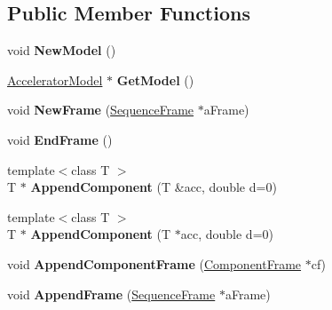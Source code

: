 \subsection*{Public Member Functions}
\begin{DoxyCompactItemize}
\item 
\mbox{\label{classAcceleratorModelConstructor_a7bf5f980e78539e2fe087d0bc17c1665}} 
void {\bfseries New\+Model} ()
\item 
\mbox{\label{classAcceleratorModelConstructor_a510b776b012e3b65835090b719b6a4e0}} 
\hyperlink{classAcceleratorModel}{Accelerator\+Model} $\ast$ {\bfseries Get\+Model} ()
\item 
\mbox{\label{classAcceleratorModelConstructor_aad55cb64c05fb52cf13ac4e1332193a9}} 
void {\bfseries New\+Frame} (\hyperlink{classSequenceFrame}{Sequence\+Frame} $\ast$a\+Frame)
\item 
\mbox{\label{classAcceleratorModelConstructor_aa8c38df39965086b3518ed805f130cf4}} 
void {\bfseries End\+Frame} ()
\item 
\mbox{\label{classAcceleratorModelConstructor_a11be4caa0df30c52c992621ae0adcba0}} 
{\footnotesize template$<$class T $>$ }\\T $\ast$ {\bfseries Append\+Component} (T \&acc, double d=0)
\item 
\mbox{\label{classAcceleratorModelConstructor_a21ccc90688cd0ea76891dda5d36c2e7b}} 
{\footnotesize template$<$class T $>$ }\\T $\ast$ {\bfseries Append\+Component} (T $\ast$acc, double d=0)
\item 
\mbox{\label{classAcceleratorModelConstructor_a6a3fd6d8e2a92651ac70e2469a396681}} 
void {\bfseries Append\+Component\+Frame} (\hyperlink{classComponentFrame}{Component\+Frame} $\ast$cf)
\item 
\mbox{\label{classAcceleratorModelConstructor_a833a360f8881b60f6eeaab636c1f6d37}} 
void {\bfseries Append\+Frame} (\hyperlink{classSequenceFrame}{Sequence\+Frame} $\ast$a\+Frame)

\end{DoxyCompactItemize}
